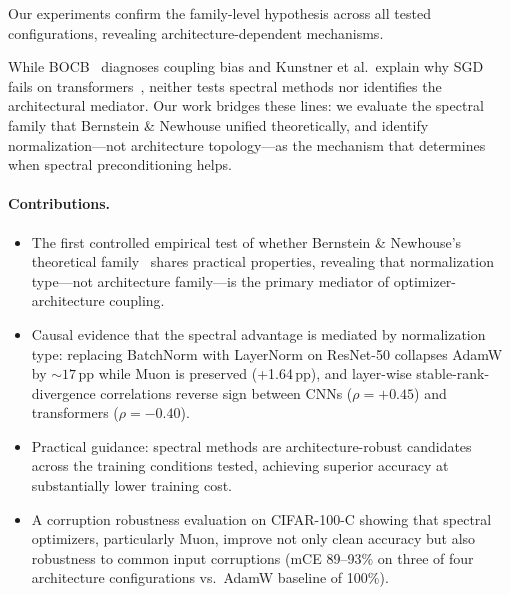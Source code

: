 Our experiments confirm the family-level hypothesis across all tested configurations, revealing architecture-dependent mechanisms.

While BOCB~\citep{li2024bocb} diagnoses coupling bias and Kunstner et al.\ explain why SGD fails on transformers~\citep{kunstner2024noise}, neither tests spectral methods nor identifies the architectural mediator. Our work bridges these lines: we evaluate the spectral family that Bernstein \& Newhouse unified theoretically, and identify normalization---not architecture topology---as the mechanism that determines when spectral preconditioning helps.

\paragraph{Contributions.}
\begin{itemize}[leftmargin=*,nosep]
\item The first controlled empirical test of whether Bernstein \& Newhouse's theoretical family~\cite{bernstein2024old} shares practical properties, revealing that normalization type---not architecture family---is the primary mediator of optimizer-architecture coupling.
\item Causal evidence that the spectral advantage is mediated by normalization type: replacing BatchNorm with LayerNorm on ResNet-50 collapses AdamW by ${\sim}17$\,pp while Muon is preserved (+1.64\,pp), and layer-wise stable-rank-divergence correlations reverse sign between CNNs ($\rho{=}{+}0.45$) and transformers ($\rho{=}{-}0.40$).
\item Practical guidance: spectral methods are architecture-robust candidates across the training conditions tested, achieving superior accuracy at substantially lower training cost.
\item A corruption robustness evaluation on CIFAR-100-C showing that spectral optimizers, particularly Muon, improve not only clean accuracy but also robustness to common input corruptions (mCE 89--93\% on three of four architecture configurations vs.\ AdamW baseline of 100\%).
\end{itemize}
